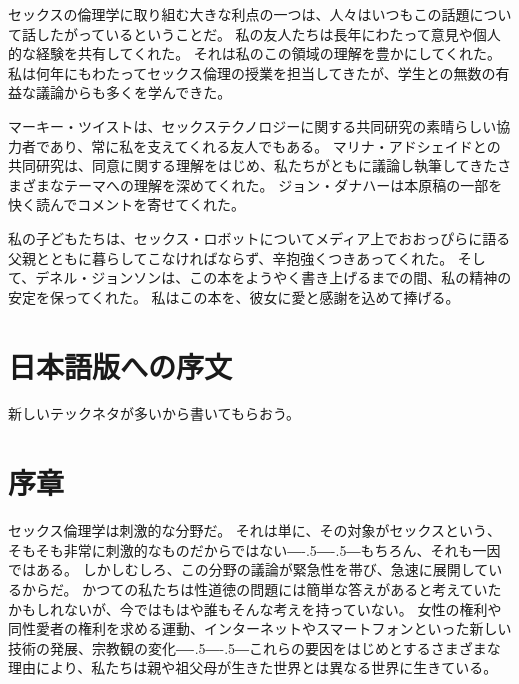\documentclass[paper=a4,book,openany]{jlreq}
\def\DDASH{―\kern-.5\zw―\kern-.5\zw―} %
\begin{document}
\vspace{2\zw}
セックスの倫理学に取り組む大きな利点の一つは、人々はいつもこの話題について話したがっているということだ。
私の友人たちは長年にわたって意見や個人的な経験を共有してくれた。
それは私のこの領域の理解を豊かにしてくれた。
私は何年にもわたってセックス倫理の授業を担当してきたが、学生との無数の有益な議論からも多くを学んできた。

マーキー・ツイストは、セックステクノロジーに関する共同研究の素晴らしい協力者であり、常に私を支えてくれる友人でもある。
マリナ・アドシェイドとの共同研究は、同意に関する理解をはじめ、私たちがともに議論し執筆してきたさまざまなテーマへの理解を深めてくれた。
ジョン・ダナハーは本原稿の一部を快く読んでコメントを寄せてくれた。

私の子どもたちは、セックス・ロボットについてメディア上でおおっぴらに語る父親とともに暮らしてこなければならず、辛抱強くつきあってくれた。
そして、デネル・ジョンソンは、この本をようやく書き上げるまでの間、私の精神の安定を保ってくれた。
私はこの本を、彼女に愛と感謝を込めて捧げる。

\chapter*{日本語版への序文}

新しいテックネタが多いから書いてもらおう。
\fi
\mainmatter

\chapter*{序章}
{}

セックス倫理学は刺激的な分野だ。
それは単に、その対象がセックスという、そもそも非常に刺激的なものだからではない{\DDASH}もちろん、それも一因ではある。
しかしむしろ、この分野の議論が緊急性を帯び、急速に展開しているからだ。
かつての私たちは性道徳の問題には簡単な答えがあると考えていたかもしれないが、今ではもはや誰もそんな考えを持っていない。
女性の権利や同性愛者の権利を求める運動、インターネットやスマートフォンといった新しい技術の発展、宗教観の変化{\DDASH}これらの要因をはじめとするさまざまな理由により、私たちは親や祖父母が生きた世界とは異なる世界に生きている。
\end{document}

